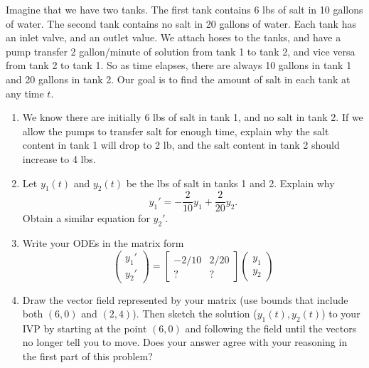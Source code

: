 \begin{problem}\label{first mixing tank system problem}
 Imagine that we have two tanks. The first tank contains 6 lbs of salt in 10 gallons of water. The second tank contains no salt in 20 gallons of water.  Each tank has an inlet valve, and an outlet value.  We attach hoses to the tanks, and have a pump transfer 2 gallon/minute of solution from tank 1 to tank 2, and vice versa from tank 2 to tank 1. So as time elapses, there are always 10 gallons in tank 1 and 20 gallons in tank 2. Our goal is to find the amount of salt in each tank at any time $t$. 
\begin{enumerate}
 \item We know there are initially 6 lbs of salt in tank 1, and no salt in tank 2. If we allow the pumps to transfer salt for enough time, explain why the salt content in tank 1 will drop to 2 lb, and the salt content in tank 2 should increase to 4 lbs.
 \item Let $y_1(t)$ and $y_2(t)$ be the lbs of salt in tanks 1 and 2.  Explain why 
$$y_1 ' = -\frac{2}{10}y_1+\frac{2}{20}y_2.$$ Obtain a similar equation for $y_2'$. 
\item Write your ODEs in the matrix form 
$$
\begin{pmatrix}
 y_1'\\y_2'
\end{pmatrix}
=
\begin{bmatrix}
 -2/10 & 2/20\\
 ? & ?
\end{bmatrix}
\begin{pmatrix}
 y_1\\y_2
\end{pmatrix}
$$
\item 
{}%
Draw the vector field represented by your matrix (use bounds that include both $(6,0)$ and $(2,4)$). 
Then sketch the solution ($y_1(t),y_2(t)$) to your IVP by starting at the point $(6,0)$ and following the field until the vectors no longer tell you to move. Does your answer agree with your reasoning in the first part of this problem?  
\end{enumerate}

\end{problem}



